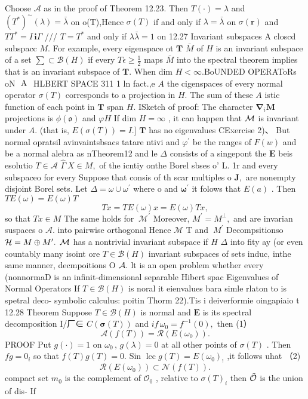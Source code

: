 Choose $\textstyle{\mathcal{A}}$ as in the proof of Theorem 12.23. Then $T(\cdot)=\lambda$ and $(T^{*})^{\sim}(\lambda)=\bar{\lambda}$ on o(T),Hence $\sigma(T)$ if and only if $\lambda=\bar{\lambda}$ on $\sigma({\boldsymbol{r}})$ and $T T^{*}=I\,\mathbf{i}\Gamma$ /// $T=T^{*}$ and only if $\lambda\bar{\lambda}=1$ on 12.27 Invariant subspaces A closcd subspacc $M.$ For example, every eigenspace ot ${\boldsymbol{T}}$ $\bar{M}$ of $\textstyle H$ is an invariant subspace of a set $\textstyle\sum\subset{\mathcal{B}}(H)$ if every $T\epsilon\geq{\frac{1}{2}}$ maps $\bar{M}$ into the spectral theorem implies that is an invariant subspace of ${\boldsymbol{T}}.$ When dim $H<\infty.$BoUNDED OPERAToRs oN $\mathrm{\boldmath~A~}$ HLBERT SPACE 311 1 ln fact.,e $\textstyle A$ the cigenspaces of every normal operator $\sigma(T)$ corresponds to a projection in $H.$ The sum of these $\textstyle A$ istic function of each point in ${\boldsymbol{T}}$ span $H.$ ISketch of proof: The character ${\mathbf{\nabla}}_{i}\mathbf{\mathbf{M}}$ projections is $\scriptstyle\phi({\mathfrak{o}})$ and $\scriptstyle{\varphi H}$ If dim $H=\infty$ , it can happen that ${\cal{M}}$ is invariant under $A.$ (that is, $E(\sigma(T))=I.]$ ${\boldsymbol{T}}$ has no eigenvalues CExercise 2)、 But normal opratsil avinvaintsbsacs tatare ntivi and $\varphi^{\prime}$ be the ranges of $F(w)$ and be a normal alebra as nTheorem12 and le $\Delta$ consists of a singepont the $\boldsymbol{E}$ beis esolutio $T\in{\mathcal{A}}$ $\hat{\Gamma}\ X\in M,$ of the icntiy onthe Borel sbses o' L. 1r and every subspaceo for every Suppose that consis of th scar multiples o ${\boldsymbol{J}},$ are nonempty disjoint Borel sets. Let $\Delta=\omega\cup\omega^{\prime}$ where o and ${\boldsymbol{\omega}}^{\prime}$ it folows that $E(a)$ . Then $T E(\omega)=E(\omega)T$ $$ T x=T E(\omega)x=E(\omega)T x, $$ so that $T x\in M$ The same holds for $\ {\mathcal{M}}^{\prime}$ Moreover, $M^{\prime}=M^{\perp},$ and are invarian suspaces o ${\mathcal{A}}.$ into pairwise orthogonal Hence $\mathcal{M}$ T and $\ M^{\prime}$ Decompsitionso ${\cal H}=M\oplus M^{\prime}.$ ${\cal{M}}$ has a nontrivial invariant subspace if $\textstyle H$ $\Delta$ into fity ay (or even countably many isoint ore $T\in{\mathcal{B}}(H)$ invariant subspaces of sets induc, inthe same manner, decmpoitions O ${\cal A}.$ lt is an open problem whether every (nonnormaD is an infinit-dimensional separable Hibert spac Eigenvalues of Normal Operators If $T\in{\mathcal{B}}(H)$ is noral it eienvalues bara simle rlaton to is spetral deco- symbolic calculus: poitin Thorm 22).Tis i deiverformie oingapiaio t 12.28 Theorem Suppose $T\in{\mathcal{B}}(H)$ is normal and $\boldsymbol{E}$ is its spectral decomposition I/厂∈ $C({\boldsymbol{\sigma}}(T))$ and $i f\,\omega_{0}=f^{-1}(0),$ then (1） $$ \mathcal{A}(f(T))=\mathcal{R}(E(\omega_{0})). $$ PROOF Put $g(\cdot)=1$ on $\omega_{0}\,,\,g(\lambda)=0$ at all other points of $\sigma(T)$ . Then $f g=0_{i}$ so that $f(T)g(T)=0.$ Sin $\operatorname{lcc}g(T)=E(\omega_{0})_{!}$ ,it follows uhat （2) $$ {\mathcal{R}}(E(\omega_{0}))\subset{\mathcal{N}}(f(T)). $$ compact set $\scriptstyle m_{0}$ is thc complement of ${\mathcal{O}}_{0}$ , relative to $\sigma(T)_{i}$ then $\tilde{\cal O}$ is the union of dis- If 